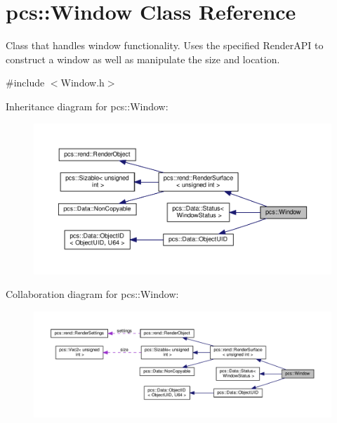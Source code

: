 \hypertarget{classpcs_1_1Window}{}\section{pcs\+:\+:Window Class Reference}
\label{classpcs_1_1Window}


Class that handles window functionality. Uses the specified Render\+A\+PI to construct a window as well as manipulate the size and location.  




{\ttfamily \#include $<$Window.\+h$>$}



Inheritance diagram for pcs\+:\+:Window\+:\nopagebreak
\begin{figure}[H]
\begin{center}
\leavevmode
\includegraphics[width=350pt]{classpcs_1_1Window__inherit__graph}
\end{center}
\end{figure}


Collaboration diagram for pcs\+:\+:Window\+:\nopagebreak
\begin{figure}[H]
\begin{center}
\leavevmode
\includegraphics[width=350pt]{classpcs_1_1Window__coll__graph}
\end{center}
\end{figure}
